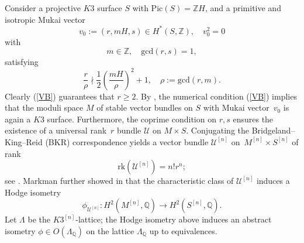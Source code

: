\documentclass[11pt]{amsart}
\theoremstyle{plain}
\theoremstyle{definition}
\theoremstyle{remark}
\newcommand{\BQ}{{\mathbb{Q}}}
\newcommand{\BZ}{{\mathbb{Z}}}
\newcommand{\CU}{{\mathcal U}}
\begin{document}
Consider a projective $K3$ surface $S$ with $\mathrm{Pic}(S)=\BZ H$, and a primitive and isotropic Mukai vector
\[
v_0:=(r, mH, s) \in H^*(S, \BZ),\quad  v_0^2=0
\]
with
\[
m\in \BZ, \quad \mathrm{gcd}(r,s)=1,
\]
satisfying
\begin{equation}\label{VB}
    \frac{r}{\rho} \nmid \frac{1}{2}\left( \frac{mH}{\rho}\right)^2 +1, \quad \rho := \mathrm{gcd}(r,m).
\end{equation}
Clearly (\ref{VB}) guarantees that $r\geq 2$. By \cite[Lemma 1.2]{Y}, the numerical condition (\ref{VB}) implies that the moduli space $M$ of stable vector bundles on $S$ with Mukai vector~$v_0$ is again a $K3$ surface. Furthermore, the coprime condition on $r, s$ ensures the existence of a universal rank~$r$ bundle $\CU$ on $M \times S$. Conjugating the Bridgeland--King--Reid (BKR) correspondence yields a vector bundle $\CU^{[n]}$ on~$M^{[n]} \times S^{[n]}$ of rank
\[
\mathrm{rk}(\CU^{[n]}) = n!r^n;
\]
see \cite[Lemma 7.1]{Markman}. Markman further showed in \cite[Section 5.6]{Markman} that the characteristic class of $\CU^{[n]}$ induces a Hodge isometry
\begin{equation}\label{isometry}
    \phi_{\CU^{[n]}}: H^2(M^{[n]}, \BQ) \to H^2(S^{[n]}, \BQ). 
\end{equation}
Let $\Lambda$ be the $K3^{[n]}$-lattice; the Hodge isometry above induces an abstract isometry $\phi \in O(\Lambda_\BQ)$ on the lattice $\Lambda_\BQ$ up to equivalences.
\end{document}
